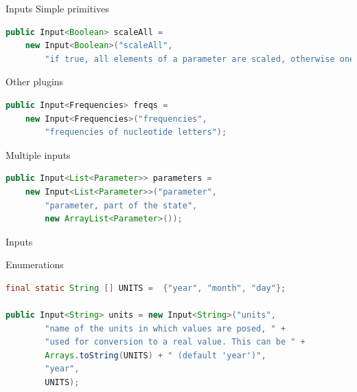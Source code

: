 \documentclass{beamer}
\theoremstyle{definition}
\begin{document}
\begin{frame}[containsverbatim]
{Inputs}
Simple primitives

\begin{lstlisting}[language=java]
public Input<Boolean> scaleAll = 
    new Input<Boolean>("scaleAll", 
        "if true, all elements of a parameter are scaled, otherwise one is randomly selected");
\end{lstlisting}

Other plugins

\begin{lstlisting}[language=java]
public Input<Frequencies> freqs = 
    new Input<Frequencies>("frequencies", 
        "frequencies of nucleotide letters");
\end{lstlisting}

Multiple inputs

\begin{lstlisting}[language=java]
public Input<List<Parameter>> parameters = 
    new Input<List<Parameter>>("parameter", 
        "parameter, part of the state",
        new ArrayList<Parameter>());
\end{lstlisting}
\end{frame}

\begin{frame}[containsverbatim]
{Inputs}

Enumerations

\begin{lstlisting}[language=java]
final static String [] UNITS =  {"year", "month", "day"};

public Input<String> units = new Input<String>("units", 
        "name of the units in which values are posed, " +
		"used for conversion to a real value. This can be " + 
        Arrays.toString(UNITS) + " (default 'year')", 
        "year", 
        UNITS);
\end{lstlisting}
\end{frame}
\end{document}
